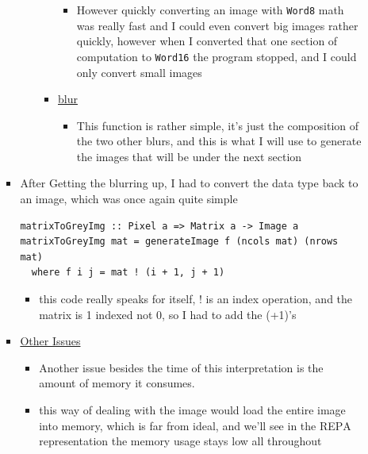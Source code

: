 \documentclass{article}
\begin{document}
\begin{enumerate}
\begin{enumerate}
\begin{itemize}
\begin{itemize}
\begin{itemize}
\begin{itemize}
\item However quickly converting an image with \texttt{Word8} math was really
fast and I could even convert big images rather quickly, however
when Ι converted that one section of computation to \texttt{Word16}
the program stopped, and Ι could only convert small images
\end{itemize}

\item \uline{blur}
\begin{itemize}
\item This function is rather simple, it's just the composition of
the two other blurs, and this is what I will use to generate the
images that will be under the next section
\end{itemize}
\end{itemize}
\end{itemize}
\item After Getting the blurring up, I had to convert the data type back
to an image, which was once again quite simple
\begin{verbatim}
matrixToGreyImg :: Pixel a => Matrix a -> Image a
matrixToGreyImg mat = generateImage f (ncols mat) (nrows mat)
  where f i j = mat ! (i + 1, j + 1)
\end{verbatim}
\begin{itemize}
\item this code really speaks for itself, ! is an index operation, and the
matrix is 1 indexed not 0, so I had to add the (+1)'s
\end{itemize}
\item \uline{Other Issues}
\begin{itemize}
\item Another issue besides the time of this interpretation is the
amount of memory it consumes.
\item this way of dealing with the image would load the entire image
into memory, which is far from ideal, and we'll see in the REPΑ
representation the memory usage stays low all throughout
\end{itemize}


\end{itemize}
\end{enumerate}
\end{enumerate}
\end{document}
